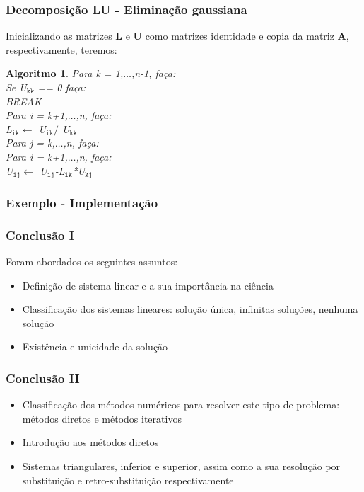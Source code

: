 \documentclass{beamer}
\theoremstyle{mystyle}
\newtheorem{algoritmo}[theorem]{Algoritmo}
\begin{document}
\begin{frame}
	\frametitle{Decomposição LU - Eliminação gaussiana}
	Inicializando as matrizes \textbf{L} e \textbf{U} como matrizes identidade e copia da matriz \textbf{A}, respectivamente, teremos:
	\begin{algoritmo}
		Para k = 1,$\ldots$,n-1, faça:\\
		\quad Se U$_{\texttt{kk}}$ == 0 faça:\\
		\quad\quad \alert{BREAK}\\
		\quad Para i = k+1,$\ldots$,n, faça:\\
		\quad\quad L$ _{\texttt{ik}} \leftarrow$ U$ _{\texttt{ik}}/$ U$ _{\texttt{kk}}$\\
		\quad Para j = k,$\ldots$,n, faça:\\
		\quad\quad Para i = k+1,$\ldots$,n, faça:\\
		\quad\quad\quad U$ _{\texttt{ij}} \leftarrow$ U$ _{\texttt{ij}}$-L$ _{\texttt{ik}}$*U$ _{\texttt{kj}}$
	\end{algoritmo}
\end{frame}

\begin{frame}
	\frametitle{Exemplo - Implementação}
	\centering
	\href{https://colab.research.google.com/drive/1hzQL6xUVDv2JrtFvoZnO_3NGbbaRZecC?usp=sharing}{}
\end{frame}

\begin{frame}
	\frametitle{Conclusão I}	
	Foram abordados os seguintes assuntos:
	\begin{itemize}
		\item Definição de sistema linear e a sua importância na ciência
		\item Classificação dos sistemas lineares: solução única, infinitas soluções, nenhuma solução
		\item Existência e unicidade da solução
	\end{itemize}
\end{frame}

\begin{frame}
	\frametitle{Conclusão II}	
	\begin{itemize}
		\item Classificação dos métodos numéricos para resolver este tipo de problema: métodos diretos e métodos iterativos
		\item Introdução aos métodos diretos 
		\item Sistemas triangulares, inferior e superior, assim como a sua resolução por substituição e retro-substituição respectivamente
	\end{itemize}
\end{frame}
\end{document}
